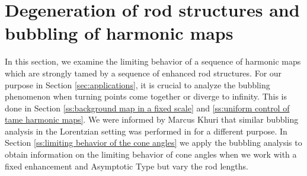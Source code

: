 \documentclass[a4paper,11pt]{amsart}
\theoremstyle{definition}
\numberwithin{equation}{section}
\begin{document}
\section{Degeneration of rod structures and bubbling of harmonic maps}\label{sec:degeneration of rod structures}
In this section, we examine the limiting behavior of a sequence of  harmonic maps which are strongly tamed by a sequence of enhanced rod structures. For our purpose in Section \ref{sec:applications}, it is crucial to analyze the bubbling phenomenon when turning points come together or diverge to infinity. This is done in Section \ref{ss:background map in a fixed scale} and \ref{ss:uniform control of tame harmonic maps}. We were informed by Marcus Khuri that similar bubbling analysis in the Lorentzian setting was performed in \cite{HKWX2} for a different purpose. In Section \ref{ss:limiting behavior of the cone angles} we apply the bubbling analysis to obtain information on the limiting behavior of cone angles when we work with a fixed enhancement and Asymptotic Type but vary the rod lengths.
\end{document}
